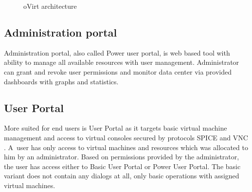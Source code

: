 \begin{figure}[h]
\caption{oVirt architecture \cite{oVirtImg}}
\label{ovirt_architecture}
\end{figure}

\subsection{Administration portal}
Administration portal, also called Power user portal, is web based tool with ability to manage all available resources with user management. Administrator can grant and revoke user permissions and monitor data center via provided dashboards with graphs and statistics. 

\subsection{User Portal}\label{userportal}
More suited for end users is User Portal as it targets basic virtual machine management and access to virtual consoles secured by protocols SPICE \cite{SPICE} and VNC \cite{VNC}. A~user has only access to virtual machines and resources which was allocated to him by an administrator. Based on permissions provided by the administrator, the user has access either to Basic User Portal or Power User Portal. The basic variant does not contain any dialogs at all, only basic operations with assigned virtual machines.

